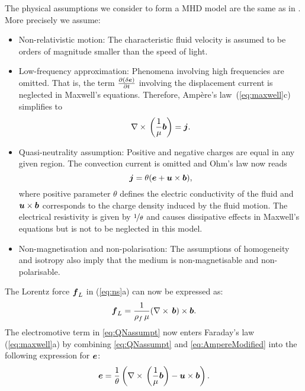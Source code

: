 The physical assumptions we consider to form a MHD model are the same as in \cite[Section 2.1]{armero1996long}. More precisely we assume:
\begin{itemize}
    \item Non-relativistic motion: The characteristic fluid velocity is assumed to be orders of magnitude smaller than the speed of light.
    \item Low-frequency approximation: Phenomena involving high frequencies are omitted. That is, the term $\frac{\partial (\delta\boldsymbol  e)}{\partial t}$ involving the  displacement current is neglected in Maxwell's equations. Therefore, Amp\`{e}re's law~(\ref{eq:maxwell}c) simplifies to
    \begin{equation} \label{eq:AmpereModified}
        \nabla\times\, \left(\frac{1}{\mu}\boldsymbol b\right) = \boldsymbol j.
    \end{equation}
    \item Quasi-neutrality assumption:  Positive and negative charges are equal in any given region. The convection current is omitted and Ohm's law now reads
    \begin{equation} \label{eq:QNassumpt}
        \boldsymbol j = \theta (\boldsymbol e+\boldsymbol u\times\boldsymbol b),
    \end{equation}
    where positive parameter $\theta$ defines the electric conductivity of the fluid and $\boldsymbol u\times\boldsymbol b$ corresponds to the charge density induced by the fluid motion. The electrical resistivity is given by $\nicefrac{1}{\theta}$ and causes dissipative effects in Maxwell's equations but is not to be neglected in this model.
    \item Non-magnetisation and non-polarisation: The assumptions of homogeneity and isotropy also imply that the medium is non-magnetisable and non-polarisable.
\end{itemize}
The Lorentz force $\boldsymbol f_L$ in (\ref{eq:ns}a) can now be expressed as:
\begin{equation} \label{eq:lorentz}
    \boldsymbol f_L = \frac{1}{\rho_{f}\,\mu} (\nabla\times\, \boldsymbol b)\times \boldsymbol b.
\end{equation}
The electromotive term in \eqref{eq:QNassumpt} now enters Faraday's law (\ref{eq:maxwell}a) by combining \eqref{eq:QNassumpt} and \eqref{eq:AmpereModified} into the following expression for $\boldsymbol e$:
\begin{equation} \nonumber
    \boldsymbol e = \frac{1}{\theta}\left(\nabla\times\, \left(\frac{1}{\mu}\boldsymbol b\right)-\boldsymbol u\times\boldsymbol b\right).
\end{equation}

